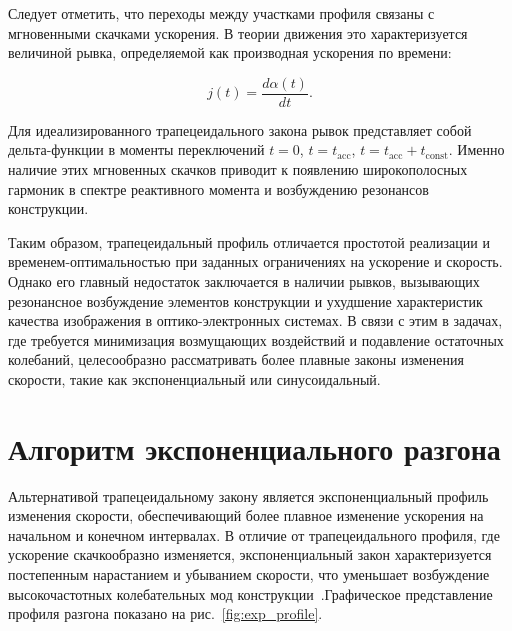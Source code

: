 Следует отметить, что переходы между участками профиля связаны с мгновенными скачками ускорения. В теории движения это характеризуется величиной рывка, определяемой как производная ускорения по времени:

\begin{equation}
	j(t) = \frac{d\alpha(t)}{dt}.
\end{equation}

Для идеализированного трапецеидального закона рывок представляет собой дельта-функции в моменты переключений $t=0$, $t=t_{\mathrm{acc}}$, $t=t_{\mathrm{acc}}+t_{\mathrm{const}}$.  Именно наличие этих мгновенных скачков приводит к появлению широкополосных гармоник в спектре реактивного момента и возбуждению резонансов конструкции.

Таким образом, трапецеидальный профиль отличается простотой реализации и временем-оптимальностью при заданных ограничениях на ускорение и скорость. Однако его главный недостаток заключается в наличии рывков, вызывающих резонансное возбуждение элементов конструкции и ухудшение характеристик качества изображения в оптико-электронных системах. В связи с этим в задачах, где требуется минимизация возмущающих воздействий и подавление остаточных колебаний, целесообразно рассматривать более плавные законы изменения скорости, такие как экспоненциальный или синусоидальный.


\section{Алгоритм экспоненциального разгона}
Альтернативой трапецеидальному закону является экспоненциальный профиль изменения скорости, обеспечивающий более плавное изменение ускорения на начальном и конечном интервалах. В отличие от трапецеидального профиля, где ускорение скачкообразно изменяется, экспоненциальный закон характеризуется постепенным нарастанием и убыванием скорости, что уменьшает возбуждение высокочастотных колебательных мод конструкции~\cite{Zeng2016,Chen2008}.Графическое представление профиля разгона показано на рис.~\ref{fig:exp_profile}.

